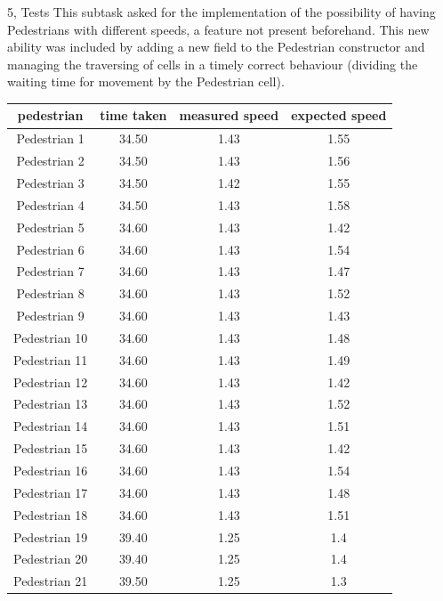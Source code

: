 \documentclass[10pt,a4paper]{article}
\begin{document}
\begin{task}{5, Tests}
This subtask asked for the implementation of the possibility of having Pedestrians with different speeds, a feature not present beforehand. This new ability was included by adding a new field to the Pedestrian constructor and managing the traversing of cells in a timely correct behaviour (dividing the waiting time for movement by the Pedestrian cell).

\begin{table}[ht!]
    	    \centering
    	    \small
    	    \begin{tabular}{ |c|c|c|c| }
            \hline
            \textbf{pedestrian} & \textbf{time taken} & \textbf{measured speed} & \textbf{expected speed}\\
            \hline
            Pedestrian 1  & 34.50 & 1.43 & 1.55\\
            Pedestrian 2  & 34.50 & 1.43 & 1.56\\
            Pedestrian 3  & 34.50 & 1.42 & 1.55\\
            Pedestrian 4  & 34.50 & 1.43 & 1.58\\
            Pedestrian 5  & 34.60 & 1.43 & 1.42\\
            Pedestrian 6  & 34.60 & 1.43 & 1.54\\
            Pedestrian 7  & 34.60 & 1.43 & 1.47\\
            Pedestrian 8  & 34.60 & 1.43 & 1.52\\
            Pedestrian 9  & 34.60 & 1.43 & 1.43\\
            Pedestrian 10 & 34.60 & 1.43 & 1.48\\
            Pedestrian 11 & 34.60 & 1.43 & 1.49\\
            Pedestrian 12 & 34.60 & 1.43 & 1.42\\
            Pedestrian 13 & 34.60 & 1.43 & 1.52\\
            Pedestrian 14 & 34.60 & 1.43 & 1.51\\
            Pedestrian 15 & 34.60 & 1.43 & 1.42\\
            Pedestrian 16 & 34.60 & 1.43 & 1.54\\
            Pedestrian 17 & 34.60 & 1.43 & 1.48\\
            Pedestrian 18 & 34.60 & 1.43 & 1.51\\
            Pedestrian 19 & 39.40 & 1.25 & 1.4\\
            Pedestrian 20 & 39.40 & 1.25 & 1.4\\
            Pedestrian 21 & 39.50 & 1.25 & 1.3\\

\end{tabular}
\end{table}
\end{task}
\end{document}
